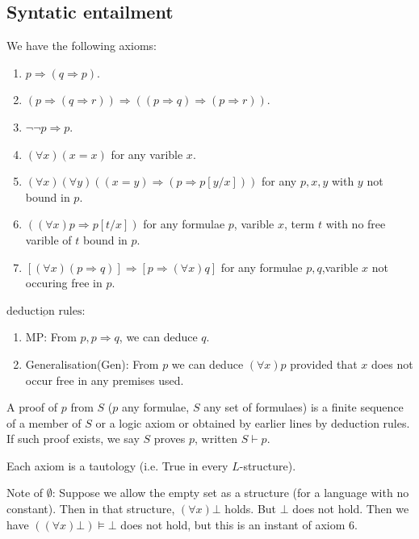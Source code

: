 \subsection{Syntatic entailment}
We have the following axioms:
\begin{enumerate}
\item $p \Rightarrow (q \Rightarrow p)$.\\
\item $(p \Rightarrow (q \Rightarrow r)) \Rightarrow ((p \Rightarrow q) \Rightarrow (p \Rightarrow r))$.\\
\item $\neg \neg p \Rightarrow p$.\\
\item $(\forall x)(x = x)$ for any varible $x$.\\
\item $(\forall x)(\forall y)((x=y) \Rightarrow (p \Rightarrow p[y/x]))$ for any $p,x,y$ with $y$ not bound in $p$.\\
\item $((\forall x)p \Rightarrow p[t/x])$ for any formulae $p$, varible $x$, term $t$ with no free varible of $t$ bound in $p$.\\
\item $[(\forall x)(p \Rightarrow q)] \Rightarrow [p \Rightarrow (\forall x) q]$ for any formulae $p,q$,varible $x$ not occuring free in $p$.
\end{enumerate}
$\underline{\text{deduction rules}}$:
\begin{enumerate}
\item MP: From $p, p \Rightarrow q$, we can deduce $q$.\\
\item Generalisation(Gen): From $p$ we can deduce $(\forall x)p$ provided that $x$ does not occur free in any premises used.
\end{enumerate}
\begin{definition} A proof of $p$ from $S$ ($p$ any formulae, $S$ any set of formulaes) is a finite sequence of a member of $S$ or a logic axiom or obtained by earlier lines by deduction rules.
If such proof exists, we say $S$ proves $p$, written $S \vdash p$.
\end{definition}
\begin{remark} Each axiom is a tautology (i.e. True in every $L$-structure).
\end{remark}
Note of $\emptyset$: Suppose we allow the empty set as a structure (for a language with no constant). Then in that structure, $(\forall x)\bot$ holds. But $\bot$ does not hold. Then we have $((\forall x)\bot) \models \bot$ does not hold, but this is an instant of axiom $6$.
